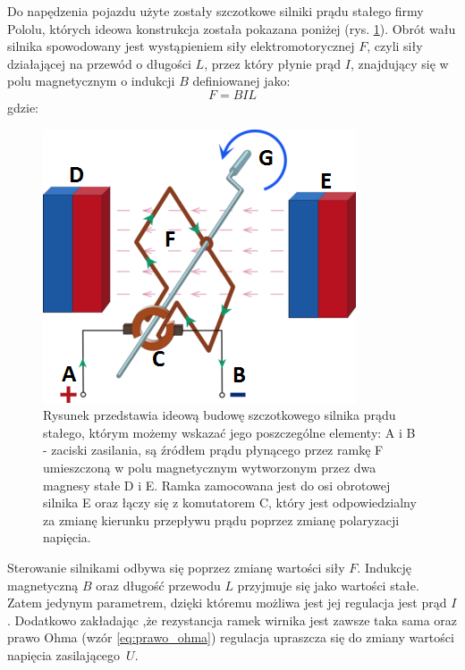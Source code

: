 Do napędzenia pojazdu użyte zostały szczotkowe silniki prądu stałego firmy Pololu, których ideowa konstrukcja została pokazana poniżej (rys. \ref{silnik_p}). Obrót wału silnika spowodowany jest wystąpieniem siły elektromotorycznej $F$, czyli siły działającej na przewód o długości $L$, przez który płynie prąd $I$, znajdujący się w polu magnetycznym o indukcji $B$ definiowanej jako:
\begin{equation}
	F =  BIL
   \label{eq:sila_elektromotoryczna}
 \end{equation}
 gdzie:  
 \begin{equationDescriptor}
 \end{equationDescriptor}
  \begin{figure}[H]
    \begin{center}
      \includegraphics[scale=0.7]{imgs/silnik_p_stalego.png}
 	\caption[Schemat ideowy silnika prądu stałego.]{\small{Rysunek przedstawia ideową budowę szczotkowego silnika prądu stałego, którym możemy wskazać jego poszczególne elementy: A i B - zaciski zasilania, są źródłem prądu płynącego przez ramkę F umieszczoną w polu magnetycznym wytworzonym przez dwa magnesy stałe D i E. Ramka zamocowana jest do osi obrotowej silnika E oraz łączy się z komutatorem C, który jest odpowiedzialny za zmianę kierunku przepływu prądu poprzez zmianę polaryzacji napięcia.}\footnotemark}
	\label{silnik_p}
    \end{center}
  \end{figure}  
\noindent
Sterowanie silnikami odbywa się poprzez zmianę wartości siły $F$. Indukcję magnetyczną $B$ oraz długość przewodu $L$ przyjmuje się jako wartości stałe. Zatem jedynym parametrem, dzięki któremu możliwa jest jej regulacja jest prąd $I$. Dodatkowo zakładając ,że rezystancja ramek wirnika jest zawsze taka sama oraz prawo Ohma (wzór \ref{eq:prawo_ohma}) regulacja upraszcza się do zmiany wartości napięcia zasilającego~$U$. 
